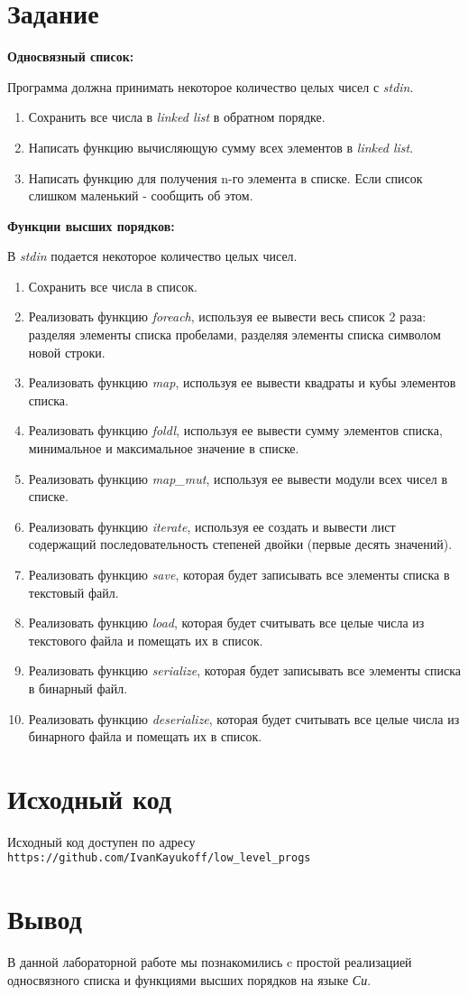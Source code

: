 \documentclass[listings]{labreport}
\begin{document}
\maketitlepage

\section*{Задание}

\textbf{Односвязный список:}

Программа должна принимать некоторое количество целых чисел с \textit{stdin}.
\begin{enumerate}
  \item Сохранить все числа в \textit{linked list} в обратном порядке.
  \item Написать функцию вычисляющую сумму всех элементов в 
    \textit{linked list}.
  \item Написать функцию для получения n-го элемента в списке. Если список
    слишком маленький - сообщить об этом.
\end{enumerate}

\textbf{Функции высших порядков:}

В \textit{stdin} подается некоторое количество целых чисел.
\begin{enumerate}
  \item Сохранить все числа в список.
  \item Реализовать функцию \textit{foreach}, используя ее вывести весь 
    список 2 раза: разделяя элементы списка пробелами, разделяя элементы 
    списка символом новой строки.
  \item Реализовать функцию \textit{map}, используя ее вывести квадраты и 
    кубы элементов списка.
  \item Реализовать функцию \textit{foldl}, используя ее вывести сумму 
    элементов списка, минимальное и максимальное значение в списке.
  \item Реализовать функцию \textit{map\_mut}, используя ее вывести модули 
    всех чисел в списке.
  \item Реализовать функцию \textit{iterate}, используя ее создать и вывести
    лист содержащий последовательность степеней двойки (первые десять
    значений).
  \item Реализовать функцию \textit{save}, которая будет записывать все 
    элементы списка в текстовый файл.
  \item Реализовать функцию \textit{load}, которая будет считывать все целые
    числа из текстового файла и помещать их в список.
  \item Реализовать функцию \textit{serialize}, которая будет записывать все 
    элементы списка в бинарный файл.
  \item Реализовать функцию \textit{deserialize}, которая будет считывать 
    все целые числа из бинарного файла и помещать их в список.
\end{enumerate}

\section*{Исходный код}

Исходный код доступен по адресу 
\texttt{https://github.com/IvanKayukoff/low\_level\_progs}

\section*{Вывод}

В данной лабораторной работе мы познакомились c простой
реализацией односвязного списка и функциями высших порядков на языке 
\textit{Си}.
\end{document}
